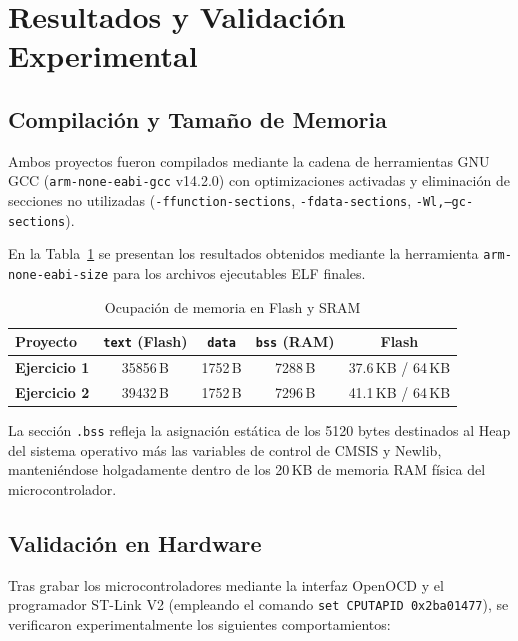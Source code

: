 \documentclass{plantilla}
\begin{document}
\section{Resultados y Validación Experimental}

\subsection{Compilación y Tamaño de Memoria}
Ambos proyectos fueron compilados mediante la cadena de herramientas GNU GCC (\texttt{arm-none-eabi-gcc} v14.2.0) con optimizaciones activadas y eliminación de secciones no utilizadas (\texttt{-ffunction-sections}, \texttt{-fdata-sections}, \texttt{-Wl,--gc-sections}).

En la Tabla~\ref{tab_memoria} se presentan los resultados obtenidos mediante la herramienta \texttt{arm-none-eabi-size} para los archivos ejecutables ELF finales.

\begin{table}[H]
\centering
\caption{Ocupación de memoria en Flash y SRAM}
\label{tab_memoria}
\scriptsize
\setlength{\tabcolsep}{3.5pt}
\begin{tabular}{@{}lcccc@{}}
\toprule
\textbf{Proyecto} & \textbf{\texttt{text} (Flash)} & \textbf{\texttt{data}} & \textbf{\texttt{bss} (RAM)} & \textbf{Flash} \\
\midrule
\textbf{Ejercicio 1} & 35856\,B & 1752\,B & 7288\,B & 37.6\,KB / 64\,KB \\
\textbf{Ejercicio 2} & 39432\,B & 1752\,B & 7296\,B & 41.1\,KB / 64\,KB \\
\bottomrule
\end{tabular}
\end{table}

La sección \texttt{.bss} refleja la asignación estática de los 5120 bytes destinados al Heap del sistema operativo más las variables de control de CMSIS y Newlib, manteniéndose holgadamente dentro de los 20\,KB de memoria RAM física del microcontrolador.

\subsection{Validación en Hardware}
Tras grabar los microcontroladores mediante la interfaz OpenOCD y el programador ST-Link V2 (empleando el comando \texttt{set CPUTAPID 0x2ba01477}), se verificaron experimentalmente los siguientes comportamientos:
\end{document}
